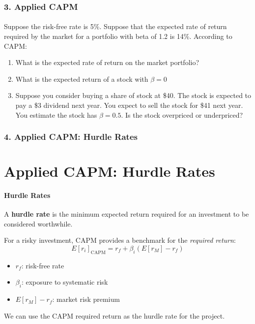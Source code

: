 \documentclass{beamer}
\begin{document}
\begin{practiceframe}[t]
    \frametitle{3. Applied CAPM}
    \framesubtitle{}

    Suppose the risk-free rate is 5\%.   Suppose that the expected rate of return 
    required by the market for a portfolio with beta of 1.2 is 14\%.  According to CAPM:
    \begin{enumerate}
        \item What is the expected rate of return on the market portfolio?
        \item What is the expected return of a stock with $\beta=0$
        \item Suppose you consider buying a share of stock at \$40.  
        The stock is expected to pay a \$3 dividend next year. 
        You expect to sell the stock for \$41 next year.  
        You estimate the stock has $\beta=0.5$.   Is the stock overpriced or 
        underpriced?
    \end{enumerate}

\end{practiceframe}


\begin{frame}[t]
    \frametitle{4. Applied CAPM: Hurdle Rates}
    \section{Applied CAPM: Hurdle Rates}
    \framesubtitle{Hurdle Rates}

    A \textbf{hurdle rate} is the minimum expected return required for
    an investment to be considered worthwhile.

    \vspace{1em}

    For a risky investment, CAPM provides a benchmark for the
    \textit{required return}:
    $$ E[r_i]_{\text{CAPM}} = r_f+\beta_i\left(E[r_M]-r_f\right)$$

    \begin{itemize}
        \item $r_f$: risk-free rate
        \item $\beta_i$: exposure to systematic risk
        \item $E[r_M]-r_f$: market risk premium
    \end{itemize}

    \vspace{1em}

    We can use the CAPM required return as the hurdle rate for the project.

\end{frame}
\end{document}
